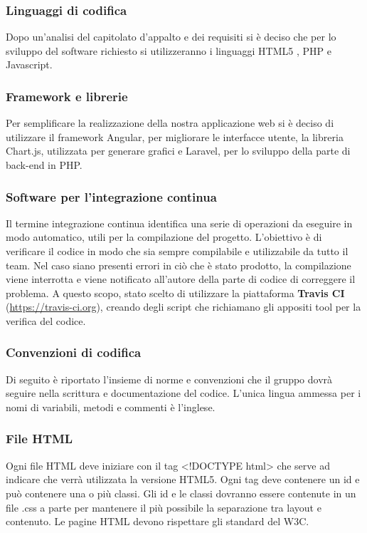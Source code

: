 \subsubsection{Linguaggi di codifica}
Dopo un'analisi del capitolato d'appalto e dei requisiti si è deciso che per lo sviluppo del software richiesto si utilizzeranno i linguaggi \gls{HTML5} , \gls{PHP} e \gls{Javascript}.

\subsubsection{Framework e librerie}
Per semplificare la realizzazione della nostra applicazione web si è deciso di utilizzare il \gls{framework} \gls{Angular}, per migliorare le interfacce utente, la libreria \gls{Chart.js}, utilizzata per generare grafici e \gls{Laravel}, per lo sviluppo della parte di back-end in \gls{PHP}.

\subsubsection{Software per l’integrazione continua}
Il termine \gls{integrazione continua} identifica una serie di operazioni da eseguire in modo automatico, utili per la compilazione del progetto. L'obiettivo è di verificare il codice in modo che sia sempre compilabile e utilizzabile da tutto il team. Nel caso siano presenti errori in ciò che è stato prodotto, la compilazione viene interrotta e viene notificato all'autore della parte di codice di correggere il problema.
A questo scopo, stato scelto di utilizzare la piattaforma \textbf{Travis CI} (\url{https://travis-ci.org}), creando degli script che richiamano gli appositi tool per la verifica del codice.

\subsubsection{Convenzioni di codifica}
Di seguito è riportato l'insieme di norme e convenzioni che il gruppo dovrà seguire nella scrittura e documentazione del codice.
L'unica lingua ammessa per i nomi di variabili, metodi e commenti è l'inglese.

\subsubsection{File HTML}

Ogni file \gls{HTML} deve iniziare con il tag <!DOCTYPE html> che serve ad indicare che verrà utilizzata la versione \gls{HTML5}.
Ogni tag deve contenere un id e può contenere una o più classi.
Gli id e le classi dovranno essere contenute in un file .css a parte per mantenere il più possibile la separazione tra \gls{layout} e contenuto.
Le pagine \gls{HTML} devono rispettare gli standard del \gls{W3C}.


